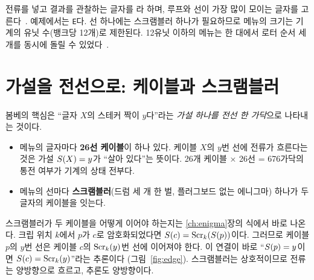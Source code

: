 전류를 넣고 결과를 관찰하는 글자를 라 하며, 루프와 선이 가장 많이 모이는 글자를
고른다~\cite[7]{us6812report1944}. 예제에서는 \texttt{E}다. 선 하나에는 스크램블러 하나가 필요하므로
메뉴의 크기는 기계의 유닛 수(뱅크당 12개)로 제한된다. 12유닛 이하의 메뉴는 한 대에서 로터 순서 세 개를
동시에 돌릴 수 있었다~\cite[43]{us6812report1944}.

\section{가설을 전선으로: 케이블과 스크램블러}\label{sec:cables}

봄베의 핵심은 ``글자 $X$의 스테커 짝이 $y$다''라는 \emph{가설 하나를 전선 한 가닥}으로 나타내는 것이다.

\begin{itemize}
\item 메뉴의 글자마다 \textbf{26선 케이블}이 하나 있다. 케이블 $X$의 $y$번 선에 전류가 흐른다는 것은
가설 $S(X) = y$가 ``살아 있다''는 뜻이다. 26개 케이블 × 26선 = 676가닥의 통전 여부가 기계의 상태 전부다.
\item 메뉴의 선마다 \textbf{스크램블러}(드럼 세 개 한 벌, 플러그보드 없는 에니그마) 하나가 두 글자의
케이블을 잇는다.
\end{itemize}

스크램블러가 두 케이블을 어떻게 이어야 하는지는 \ref{ch:enigma}장의 식에서 바로 나온다. 크립 위치 $k$에서
$p$가 $c$로 암호화되었다면 $S(c) = \mathrm{Scr}_k(S(p))$이다. 그러므로 케이블 $p$의 $y$번 선은 케이블 $c$의
$\mathrm{Scr}_k(y)$번 선에 이어져야 한다. 이 연결이 바로 ``$S(p)=y$이면 $S(c)=\mathrm{Scr}_k(y)$''라는 추론이다
(그림~\ref{fig:edge}). 스크램블러는 상호적이므로 전류는 양방향으로 흐르고, 추론도 양방향이다.

